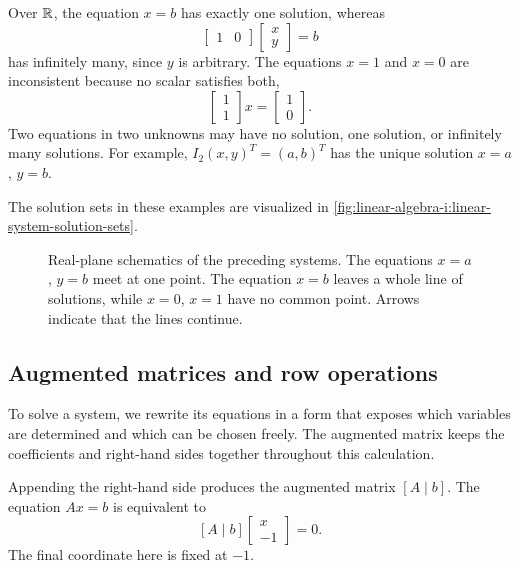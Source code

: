 Over \(\mathbb{R}\), the equation \(x=b\) has exactly one solution, whereas
\[
  \begin{bmatrix}1&0\end{bmatrix}
  \begin{bmatrix}x\\y\end{bmatrix}=b
\]
has infinitely many, since \(y\) is arbitrary. The equations \(x=1\) and
\(x=0\) are inconsistent because no scalar satisfies both,
\[
  \begin{bmatrix}1\\1\end{bmatrix}x=\begin{bmatrix}1\\0\end{bmatrix}.
\]
Two equations in two unknowns may have no solution, one solution, or
infinitely many solutions. For example, \(I_2(x,y)^T=(a,b)^T\) has the
unique solution \(x=a\), \(y=b\).

The solution sets in these examples are visualized in
\autoref{fig:linear-algebra-i:linear-system-solution-sets}.
\begin{figure}[htbp]
  \centering
  
  \caption[Three kinds of solution sets]{Real-plane schematics of the
    preceding systems. The equations \(x=a\), \(y=b\) meet at one point.
    The equation \(x=b\) leaves a whole line of solutions, while \(x=0\), \(x=1\)
    have no common point. Arrows indicate that the lines continue.}
  \label{fig:linear-algebra-i:linear-system-solution-sets}
\end{figure}

\subsection{Augmented matrices and row operations}

To solve a system, we rewrite its equations in a form that exposes which
variables are determined and which can be chosen freely. The augmented
matrix keeps the coefficients and right-hand sides together throughout
this calculation.

Appending the right-hand side produces the augmented matrix
\([A\mid b]\). The equation \(Ax=b\) is equivalent to
\[
  [A\mid b]\begin{bmatrix}x\\-1\end{bmatrix}=0.
\]
The final coordinate here is fixed at \(-1\).

